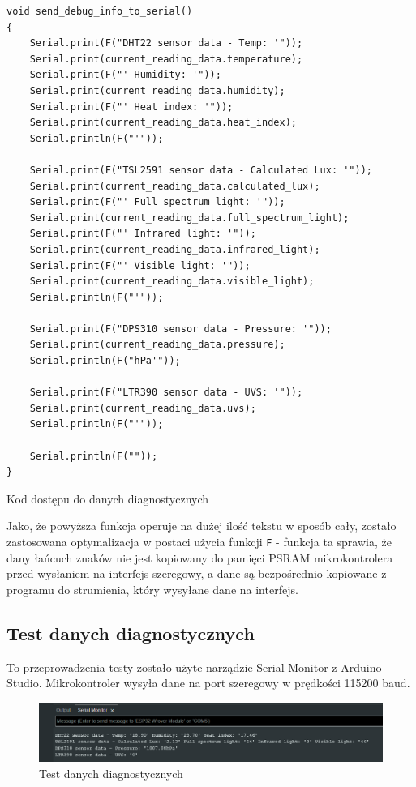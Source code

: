 \documentclass[12pt,a4paper]{article}
\begin{document}
\begin{code}[H]
\begin{verbatim}
void send_debug_info_to_serial()
{
    Serial.print(F("DHT22 sensor data - Temp: '"));
    Serial.print(current_reading_data.temperature);
    Serial.print(F("' Humidity: '"));
    Serial.print(current_reading_data.humidity);
    Serial.print(F("' Heat index: '"));
    Serial.print(current_reading_data.heat_index);
    Serial.println(F("'"));

    Serial.print(F("TSL2591 sensor data - Calculated Lux: '"));
    Serial.print(current_reading_data.calculated_lux);
    Serial.print(F("' Full spectrum light: '"));
    Serial.print(current_reading_data.full_spectrum_light);
    Serial.print(F("' Infrared light: '"));
    Serial.print(current_reading_data.infrared_light);
    Serial.print(F("' Visible light: '"));
    Serial.print(current_reading_data.visible_light);
    Serial.println(F("'"));

    Serial.print(F("DPS310 sensor data - Pressure: '"));
    Serial.print(current_reading_data.pressure);
    Serial.println(F("hPa'"));

    Serial.print(F("LTR390 sensor data - UVS: '"));
    Serial.print(current_reading_data.uvs);
    Serial.println(F("'"));

    Serial.println(F(""));
}
\end{verbatim}
\caption{Kod dostępu do danych diagnostycznych}
\label{diagnostic-data-code}
\end{code}

Jako, że powyższa funkcja operuje na dużej ilość tekstu w sposób cały, zostało zastosowana optymalizacja w postaci użycia funkcji 
\texttt{F} - funkcja ta sprawia, że dany łańcuch znaków nie jest kopiowany do pamięci PSRAM mikrokontrolera przed wysłaniem na interfejs szeregowy, a dane są bezpośrednio kopiowane z programu do strumienia, który wysyłane dane na interfejs.

\subsection{Test danych diagnostycznych}

To przeprowadzenia testy zostało użyte narządzie Serial Monitor z Arduino Studio. Mikrokontroler wysyła dane na port szeregowy w prędkości 115200 baud.

\begin{figure}[H]
    \centering
    \includegraphics[width=\textwidth]{diagnostic-data.png}
    \caption{Test danych diagnostycznych}
\end{figure}
\end{document}
